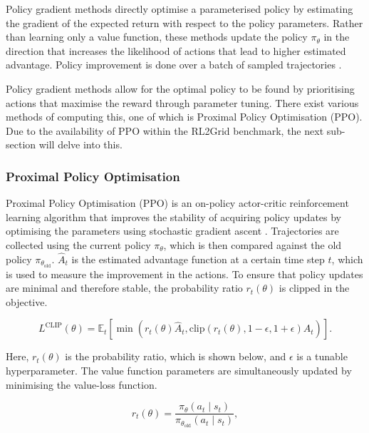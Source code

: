 Policy gradient methods \cite{ghasemi2024comprehensive} directly optimise a parameterised policy by estimating the gradient of the expected return with respect to the policy parameters. Rather than learning only a value function, these methods update the policy $\pi_{\theta}$ in the direction that increases the likelihood of actions that lead to higher estimated advantage. Policy improvement is done over a batch of sampled trajectories \cite{ghasemi2024comprehensive}. 

Policy gradient methods allow for the optimal policy to be found by prioritising actions that maximise the reward through parameter tuning. There exist various methods of computing this, one of which is Proximal Policy Optimisation (PPO). Due to the availability of PPO within the RL2Grid benchmark, the next sub-section will delve into this.

\subsubsection{Proximal Policy Optimisation} 

Proximal Policy Optimisation (PPO) is an on-policy actor-critic reinforcement learning algorithm that improves the stability of acquiring policy updates by optimising the parameters using stochastic gradient ascent \cite{schulman2017proximal}. Trajectories are collected using the current policy $\pi_\theta$, which is then compared against the old policy $\pi_{\theta_{\text{old}}}$. $\hat{A}_t$ is the estimated advantage function at a certain time step $t$, which is used to measure the improvement in the actions. To ensure that policy updates are minimal and therefore stable, the probability ratio $r_t(\theta)$ is clipped in the objective. 

\begin{equation}
L^{\text{CLIP}}(\theta) =
\mathbb{E}_t
\left[
\min
\left(
r_t(\theta)\hat{A}_t,
\text{clip}
\left(
r_t(\theta), 1-\epsilon, 1+\epsilon
\right)
\hat{A}_t
\right)
\right].
\end{equation}

Here, $r_t(\theta)$ is the probability ratio, which is shown below, and $\epsilon$ is a tunable hyperparameter. The value function parameters are simultaneously updated by minimising the value-loss function.

\begin{equation}
r_t(\theta) =
\frac{\pi_\theta(a_t \mid s_t)}
{\pi_{\theta_{\text{old}}}(a_t \mid s_t)} ,
\end{equation}

